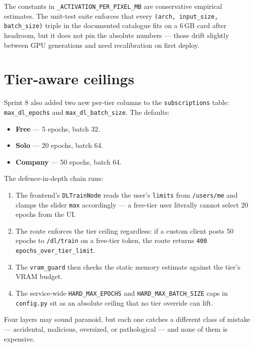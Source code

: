 \documentclass[12pt, a4paper]{report}
\begin{document}
The constants in \texttt{\_ACTIVATION\_PER\_PIXEL\_MB} are conservative
empirical estimates. The unit-test suite enforces that every
\texttt{(arch, input\_size, batch\_size)} triple in the documented
catalogue fits on a 6\,GB card after headroom, but it does not pin
the absolute numbers --- those drift slightly between GPU generations
and need recalibration on first deploy.

\section{Tier-aware ceilings}

Sprint 8 also added two new per-tier columns to the
\texttt{subscriptions} table: \texttt{max\_dl\_epochs} and
\texttt{max\_dl\_batch\_size}. The defaults:

\begin{itemize}
    \item \textbf{Free} --- 5 epochs, batch 32.
    \item \textbf{Solo} --- 20 epochs, batch 64.
    \item \textbf{Company} --- 50 epochs, batch 64.
\end{itemize}

The defence-in-depth chain runs:

\begin{enumerate}
    \item The frontend's \texttt{DLTrainNode} reads the user's
        \texttt{limits} from \texttt{/users/me} and clamps the slider
        \texttt{max} accordingly --- a free-tier user literally cannot
        select 20 epochs from the UI.
    \item The route enforces the tier ceiling regardless: if a custom
        client posts 50 epochs to \texttt{/dl/train} on a free-tier
        token, the route returns \texttt{400
        epochs\_over\_tier\_limit}.
    \item The \texttt{vram\_guard} then checks the static memory
        estimate against the tier's VRAM budget.
    \item The service-wide \texttt{HARD\_MAX\_EPOCHS} and
        \texttt{HARD\_MAX\_BATCH\_SIZE} caps in \texttt{config.py}
        sit as an absolute ceiling that no tier override can lift.
\end{enumerate}

Four layers may sound paranoid, but each one catches a different class
of mistake --- accidental, malicious, oversized, or pathological ---
and none of them is expensive.
\end{document}
